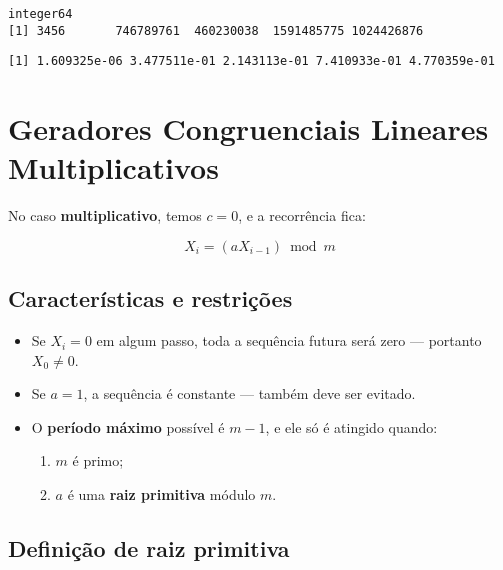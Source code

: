 \documentclass[
  letterpaper,
  DIV=11,
  numbers=noendperiod]{scrreprt}
\newenvironment{Shaded}{\begin{snugshade}}{\end{snugshade}}
\newcommand{\NormalTok}[1]{\textcolor[rgb]{0.00,0.23,0.31}{#1}}
\newcommand{\SpecialCharTok}[1]{\textcolor[rgb]{0.37,0.37,0.37}{#1}}
\providecommand{\tightlist}{%
  \setlength{\itemsep}{0pt}\setlength{\parskip}{0pt}}\usepackage{longtable,booktabs,array}
\begin{document}
\begin{verbatim}
integer64
[1] 3456       746789761  460230038  1591485775 1024426876
\end{verbatim}

\begin{Shaded}
\end{Shaded}

\begin{verbatim}
[1] 1.609325e-06 3.477511e-01 2.143113e-01 7.410933e-01 4.770359e-01
\end{verbatim}

\section{Geradores Congruenciais Lineares
Multiplicativos}\label{geradores-congruenciais-lineares-multiplicativos}

No caso \textbf{multiplicativo}, temos \(c = 0\), e a recorrência fica:

\[
X_i = (a X_{i-1}) \bmod m
\]

\subsection{Características e
restrições}\label{caracteruxedsticas-e-restriuxe7uxf5es}

\begin{itemize}
\tightlist
\item
  Se \(X_i = 0\) em algum passo, toda a sequência futura será zero ---
  portanto \(X_0 \neq 0\).
\item
  Se \(a = 1\), a sequência é constante --- também deve ser evitado.
\item
  O \textbf{período máximo} possível é \(m - 1\), e ele só é atingido
  quando:

  \begin{enumerate}
  \def\labelenumi{\arabic{enumi}.}
  \tightlist
  \item
    \(m\) é primo;
  \item
    \(a\) é uma \textbf{raiz primitiva} módulo \(m\).
  \end{enumerate}
\end{itemize}

\subsection{Definição de raiz
primitiva}\label{definiuxe7uxe3o-de-raiz-primitiva}
\end{document}
